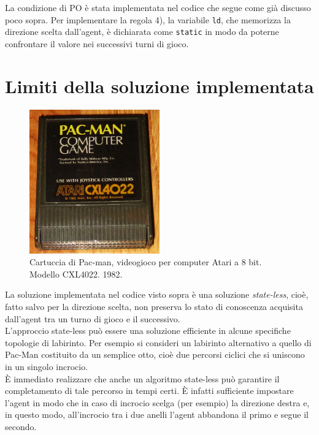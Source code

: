 \documentclass[8pt]{book}
\begin{document}
\textsf{La condizione di PO è stata implementata nel codice che segue come già discusso poco sopra. Per implementare la regola 4), la variabile} \texttt{ld}, \textsf{che memorizza la direzione scelta dall'agent, è dichiarata come} \texttt{static} \textsf{in modo da poterne confrontare il valore nei successivi turni di gioco.}\\

\section{Limiti della soluzione implementata}

\begin{figure}
  \centering
  \includegraphics[width=0.5\textwidth]{img/imgConLicenza/cartuccia/cartuccia.jpg}
  \caption{Cartuccia di Pac-man, videogioco per computer Atari a 8 bit. Modello CXL4022. 1982.}
  \label{cartuccia}
\end{figure}

La soluzione implementata nel codice visto sopra è una soluzione \emph{state-less}, cioè, fatto salvo per la direzione scelta, non preserva lo stato di conoscenza acquisita dall'agent tra un turno di gioco e il successivo.\\
L'approccio state-less può essere una soluzione efficiente in alcune specifiche topologie di labirinto. Per esempio si consideri un labirinto alternativo a quello di Pac-Man costituito da un semplice otto, cioè due percorsi ciclici che si uniscono in un singolo incrocio.\\

È immediato realizzare che anche un algoritmo state-less può garantire il completamento di tale percorso in tempi certi. \`E infatti sufficiente impostare l'agent in modo che in caso di incrocio scelga (per esempio) la direzione destra e, in questo modo, all'incrocio tra i due anelli l'agent abbandona il primo e segue il secondo.\\
\end{document}
